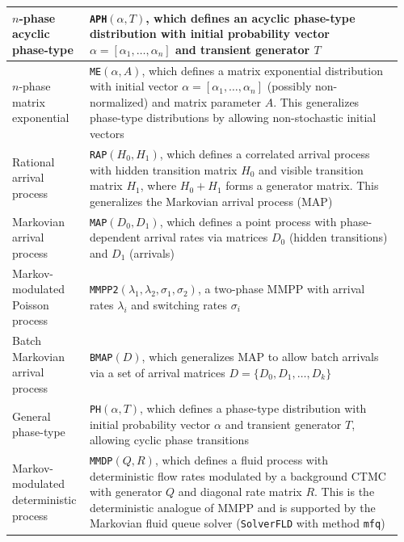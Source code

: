 \begin{table}[t!]
{\begin{tabular}{|p{0.18\linewidth}|p{0.78\linewidth}|}
\hline
$n$-phase acyclic phase-type\index{Phase-type distribution|see{Network models}} & \texttt{APH}$(\alpha,T)$, which defines an acyclic phase-type distribution with initial probability vector $\alpha=[\alpha_1,\ldots,\alpha_n]$ and transient generator $T$ \\
\hline
$n$-phase matrix exponential\index{Matrix Exponential distribution|see{Network models}} & \texttt{ME}$(\alpha,A)$, which defines a matrix exponential distribution with initial vector $\alpha=[\alpha_1,\ldots,\alpha_n]$ (possibly non-normalized) and matrix parameter $A$. This generalizes phase-type distributions by allowing non-stochastic initial vectors~\cite{BladtN17} \\
\hline
Rational arrival process\index{Rational Arrival Process|see{Network models}} & \texttt{RAP}$(H_0,H_1)$, which defines a correlated arrival process with hidden transition matrix $H_0$ and visible transition matrix $H_1$, where $H_0+H_1$ forms a generator matrix. This generalizes the Markovian arrival process (MAP)~\cite{AsmussenB99} \\
\hline
Markovian arrival process\index{MAP (Markovian Arrival Process)|see{Network models}} & \texttt{MAP}$(D_0,D_1)$, which defines a point process with phase-dependent arrival rates via matrices $D_0$ (hidden transitions) and $D_1$ (arrivals) \\
\hline
Markov-modulated Poisson process\index{MMPP (Markov-Modulated Poisson)|see{Network models}} & \texttt{MMPP2}$(\lambda_1,\lambda_2,\sigma_1,\sigma_2)$, a two-phase MMPP with arrival rates $\lambda_i$ and switching rates $\sigma_i$ \\
\hline
Batch Markovian arrival process\index{BMAP (Batch MAP)|see{Network models}} & \texttt{BMAP}$(D)$, which generalizes MAP to allow batch arrivals via a set of arrival matrices $D=\{D_0,D_1,\ldots,D_k\}$ \\
\hline
General phase-type & \texttt{PH}$(\alpha,T)$, which defines a phase-type distribution with initial probability vector $\alpha$ and transient generator $T$, allowing cyclic phase transitions \\
\hline
Markov-modulated deterministic process\index{MMDP (Markov-Modulated Deterministic Process)|see{Network models}} & \texttt{MMDP}$(Q,R)$, which defines a fluid process with deterministic flow rates modulated by a background CTMC with generator $Q$ and diagonal rate matrix $R$. This is the deterministic analogue of MMPP and is supported by the Markovian fluid queue solver (\texttt{SolverFLD} with method \texttt{mfq}) \\

\end{tabular}}
\end{table}
